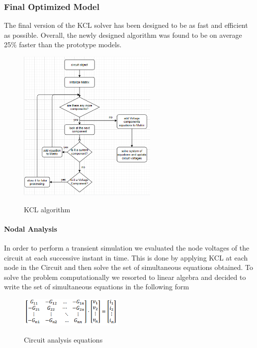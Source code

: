 \documentclass{article}
\begin{document}
\subsubsection{Final Optimized Model}\label{ssec:optimizedmodel}
The final version of the KCL solver has been designed to be as fast and efficient as possible. Overall, the newly designed algorithm was found to be on average 25\% faster than the prototype models.

\begin{figure}[h]
    \caption{KCL algorithm}
    \centering
    \includegraphics[width=0.6\textwidth]{images/KCL_flowchart.PNG}
    \label{fig:KCLFlowchart}
\end{figure}

\paragraph{Nodal Analysis}
In order to perform a transient simulation we evaluated the node voltages of the circuit at each successive instant in time. This is done by applying KCL at each node in the Circuit and then solve the set of simultaneous equations obtained.\medbreak
To solve the problem computationally we resorted to linear algebra and decided to write the set of simultaneous equations in the following form
\begin{figure}[h]
    \caption{Circuit analysis equations}
    \centering
    \includegraphics[width=5cm]{images/Conductance_Matrix.PNG}
    \label{fig:ConductanceMat}
\end{figure}
\end{document}
